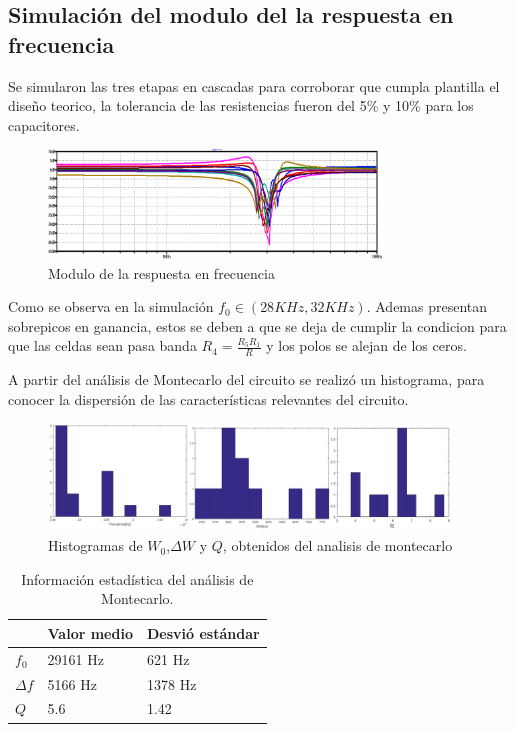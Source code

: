 \documentclass[../../tc_tp5_main.tex]{subfiles}
\begin{document}
\subsection{Simulación del modulo del la respuesta en frecuencia}
Se simularon las tres etapas en cascadas para corroborar que cumpla plantilla el diseño teorico, la tolerancia de las resistencias fueron del 5\% y 10\% para los capacitores.
\begin{figure}[H]	
	\centering
	\includegraphics[width=0.8\textwidth]{imagenes/montecarlo.png}
	\caption{Modulo de la respuesta en frecuencia}
\end{figure}
Como se observa en la simulación $f_0\in (28KHz,32KHz)$. Ademas presentan sobrepicos en ganancia, estos se deben a que se deja de cumplir la condicion para que las celdas sean pasa banda $R_4=\frac{R_5 R_1}{R}$ y los polos se alejan de los ceros.

A partir del análisis de Montecarlo del circuito se realizó un histograma, para conocer la dispersión de las características relevantes del circuito.

\begin{figure}[H]	
	\centering
	\includegraphics[width=0.95\textwidth]{imagenes/hist.png}
	\caption{Histogramas de $W_0$,$\Delta W$ y $Q$, obtenidos del analisis de montecarlo}
\end{figure}

\begin{table}[H]
\begin{center}
\begin{tabular}{|l|l|l|}
\hline
 &Valor medio &Desvió estándar\\
\hline \hline

$ f_0$ &29161 Hz &621 Hz  \\ \hline
$\Delta f$ & 5166 Hz&1378 Hz  \\ \hline
$Q$ &5.6 &1.42  \\ \hline

\end{tabular}
\caption{Información estadística del análisis de Montecarlo.} 
\end{center}
\end{table}
\end{document}
